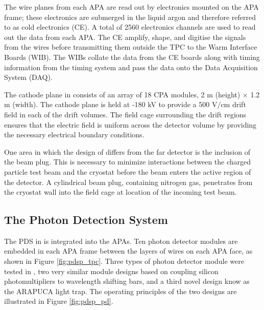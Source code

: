The wire planes from each APA are read out by electronics mounted on the APA 
frame; these electronics are submerged in the liquid argon and therefore 
referred to as cold electronics (CE). A total of 2560 electronics channels are 
used to read out the data from each APA. The CE amplify, shape, and digitise the
signals from the wires before transmitting them outside the TPC to the Warm
Interface Boards (WIB). The WIBs collate the data from the CE boards along with
timing information from the timing system and pass the data onto the 
Data Acquisition System (DAQ).

The cathode plane in \protodune{} consists of an array of 18 CPA modules, 2 m 
(height) $\times$ 1.2 m (width). The cathode plane is held at -180 kV to 
provide a 500 $\mbox{V/cm}$ drift field in each of the drift volumes. The 
field cage surrounding the drift regions ensures that the electric field is 
uniform across the detector volume by providing the necessary electrical
boundary conditions.

One area in which the design of \protodune{} differs from the far detector is
the inclusion of the beam plug. This is necessary to minimize interactions
between the charged particle test beam and the cryostat before the beam enters 
the active region of the detector. A cylindrical beam plug, containing 
nitrogen gas, penetrates from the cryostat wall into the field cage at 
location of the incoming test beam. 

\subsection{The Photon Detection System}

The PDS in \protodune{} is integrated into the APAs. Ten photon detector modules
are embedded in each APA frame between the layers of wires on each APA 
face, as shown in Figure \ref{fig:pdsp_tpc}. Three types of photon detector
module were tested in \protodune{}, two very similar module designs based on
coupling silicon photomultipliers to wavelength shifting bars, and a third 
novel design know as the ARAPUCA light trap. The operating principles of the 
two designs are illustrated in Figure \ref{fig:pdsp_pd}.

